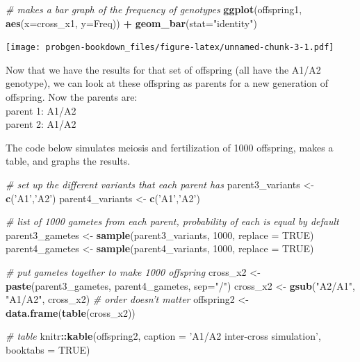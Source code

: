 \documentclass[]{book}
\newenvironment{Shaded}{\begin{snugshade}}{\end{snugshade}}
\newcommand{\KeywordTok}[1]{\textcolor[rgb]{0.13,0.29,0.53}{\textbf{#1}}}
\newcommand{\DataTypeTok}[1]{\textcolor[rgb]{0.13,0.29,0.53}{#1}}
\newcommand{\DecValTok}[1]{\textcolor[rgb]{0.00,0.00,0.81}{#1}}
\newcommand{\StringTok}[1]{\textcolor[rgb]{0.31,0.60,0.02}{#1}}
\newcommand{\CommentTok}[1]{\textcolor[rgb]{0.56,0.35,0.01}{\textit{#1}}}
\newcommand{\OtherTok}[1]{\textcolor[rgb]{0.56,0.35,0.01}{#1}}
\newcommand{\OperatorTok}[1]{\textcolor[rgb]{0.81,0.36,0.00}{\textbf{#1}}}
\newcommand{\NormalTok}[1]{#1}
\theoremstyle{definition}
\theoremstyle{definition}
\theoremstyle{definition}
\theoremstyle{remark}
\begin{document}
\begin{Shaded}
\begin{Highlighting}[]
\CommentTok{# makes a bar graph of the frequency of genotypes}
\KeywordTok{ggplot}\NormalTok{(offspring1, }\KeywordTok{aes}\NormalTok{(}\DataTypeTok{x=}\NormalTok{cross_x1, }\DataTypeTok{y=}\NormalTok{Freq)) }\OperatorTok{+}\StringTok{ }\KeywordTok{geom_bar}\NormalTok{(}\DataTypeTok{stat=}\StringTok{"identity"}\NormalTok{)}
\end{Highlighting}
\end{Shaded}

\texttt{[image: probgen-bookdown\_files/figure-latex/unnamed-chunk-3-1.pdf]}

Now that we have the results for that set of offspring (all have the
A1/A2 genotype), we can look at these offspring as parents for a new
generation of offspring. Now the parents are:\\
parent 1: A1/A2\\
parent 2: A1/A2

The code below simulates meiosis and fertilization of 1000 offspring,
makes a table, and graphs the results.

\begin{Shaded}
\begin{Highlighting}[]
\CommentTok{# set up the different variants that each parent has}
\NormalTok{parent3_variants <-}\StringTok{ }\KeywordTok{c}\NormalTok{(}\StringTok{'A1'}\NormalTok{,}\StringTok{'A2'}\NormalTok{)}
\NormalTok{parent4_variants <-}\StringTok{ }\KeywordTok{c}\NormalTok{(}\StringTok{'A1'}\NormalTok{,}\StringTok{'A2'}\NormalTok{)}

\CommentTok{# list of 1000 gametes from each parent, probability of each is equal by default}
\NormalTok{parent3_gametes <-}\StringTok{ }\KeywordTok{sample}\NormalTok{(parent3_variants, }\DecValTok{1000}\NormalTok{, }\DataTypeTok{replace =} \OtherTok{TRUE}\NormalTok{)}
\NormalTok{parent4_gametes <-}\StringTok{ }\KeywordTok{sample}\NormalTok{(parent4_variants, }\DecValTok{1000}\NormalTok{, }\DataTypeTok{replace =} \OtherTok{TRUE}\NormalTok{)}

\CommentTok{# put gametes together to make 1000 offspring}
\NormalTok{cross_x2 <-}\StringTok{ }\KeywordTok{paste}\NormalTok{(parent3_gametes, parent4_gametes, }\DataTypeTok{sep=}\StringTok{"/"}\NormalTok{)}
\NormalTok{cross_x2 <-}\StringTok{ }\KeywordTok{gsub}\NormalTok{(}\StringTok{"A2/A1"}\NormalTok{, }\StringTok{"A1/A2"}\NormalTok{, cross_x2) }\CommentTok{# order doesn't matter}
\NormalTok{offspring2 <-}\StringTok{ }\KeywordTok{data.frame}\NormalTok{(}\KeywordTok{table}\NormalTok{(cross_x2))}

\CommentTok{# table}
\NormalTok{knitr}\OperatorTok{::}\KeywordTok{kable}\NormalTok{(offspring2, }\DataTypeTok{caption =} \StringTok{'A1/A2 inter-cross simulation'}\NormalTok{, }\DataTypeTok{booktabs =} \OtherTok{TRUE}\NormalTok{)}
\end{Highlighting}
\end{Shaded}
\end{document}
